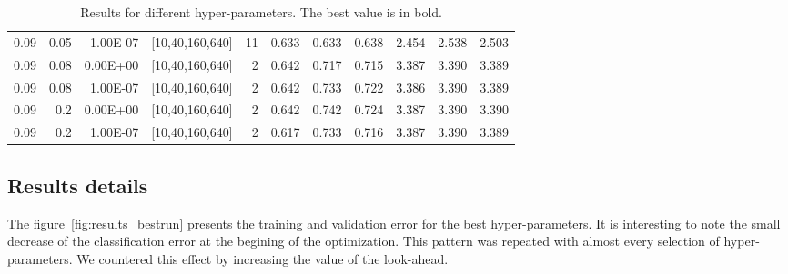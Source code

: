 \begin{table}[f]
\begin{tabular}{@{}rrrrrrrrrrr@{}}
0.09 & 0.05 & 1.00E-07 & {[}10,40,160,640{]} & 11 & 0.633 & 0.633 & 0.638 & 2.454 & 2.538 & 2.503 \\
0.09 & 0.08 & 0.00E+00 & {[}10,40,160,640{]} & 2 & 0.642 & 0.717 & 0.715 & 3.387 & 3.390 & 3.389 \\
0.09 & 0.08 & 1.00E-07 & {[}10,40,160,640{]} & 2 & 0.642 & 0.733 & 0.722 & 3.386 & 3.390 & 3.389 \\
0.09 & 0.2 & 0.00E+00 & {[}10,40,160,640{]} & 2 & 0.642 & 0.742 & 0.724 & 3.387 & 3.390 & 3.390 \\
0.09 & 0.2 & 1.00E-07 & {[}10,40,160,640{]} & 2 & 0.617 & 0.733 & 0.716 & 3.387 & 3.390 & 3.389 \\ \bottomrule
\end{tabular}
\caption{Results for different hyper-parameters. The best value is in bold.}
\end{table}

\subsection{Results details}
The figure~\ref{fig:results_bestrun} presents the training and validation error for the best hyper-parameters. It is interesting to note the small decrease of the classification error at the begining of the optimization. This pattern was repeated with almost every selection of hyper-parameters. We countered this effect by increasing the value of the look-ahead.



